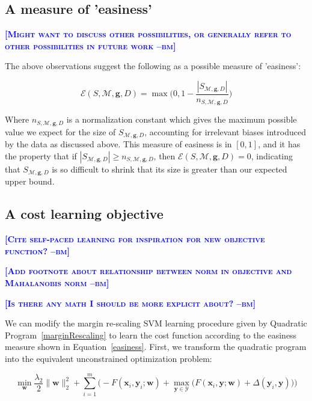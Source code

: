 \documentclass{article} %
\newcommand{\bmcomment}[1]{\textcolor{blue}{\textsc{\textbf{[#1 --bm]}}}}
\begin{document}
\subsection{A measure of 'easiness'}

\bmcomment{Might want to discuss other possibilities, or generally
refer to other possibilities in future work}

The above observations suggest the following as a possible 
measure of 'easiness':

\begin{equation}
\label{easiness}
\mathcal{E}(S,\mathcal{M},\mathbf{g},D)=\max\bigg(0, 1-\frac{|S_{\mathcal{M},\mathbf{g},D}|}{n_{S,\mathcal{M},\mathbf{g},D}}\bigg)
\end{equation}

Where $n_{S,\mathcal{M},\mathbf{g},D}$ is a normalization constant which
gives the maximum possible value we expect for the size of 
$S_{\mathcal{M},\mathbf{g},D}$, accounting for irrelevant biases
introduced by the data as discussed above.  This measure of easiness 
is in $[0,1]$, and it has the property that if 
$|S_{\mathcal{M},\mathbf{g},D}|\geq n_{S,\mathcal{M},\mathbf{g},D}$,
then $\mathcal{E}(S,\mathcal{M},\mathbf{g},D)=0$, indicating that
$S_{\mathcal{M},\mathbf{g},D}$ is so difficult to shrink that its
size is greater than our expected upper bound.

\subsection{A cost learning objective}

\bmcomment{Cite self-paced learning for inspiration for new objective function?}

\bmcomment{Add footnote about relationship between norm in objective and
Mahalanobis norm}

\bmcomment{Is there any math I should be more explicit about?}

We can modify the margin re-scaling SVM learning procedure given by 
Quadratic Program~\ref{marginRescaling} to learn the cost function 
according to the easiness measure shown in Equation~\ref{easiness}.
First, we transform the quadratic program
into the equivalent unconstrained optimization problem:

\begin{equation}
\label{svmObjective}
\min_{\mathbf{w}} \frac{\lambda_2}{2}\|\mathbf{w}\|_2^2 + \sum_{i=1}^m\bigg(-F(\mathbf{x}_i,\mathbf{y}_i;\mathbf{w})+\max_{\mathbf{y}\in \mathcal{Y}}\Big(F(\mathbf{x}_i,\mathbf{y};\mathbf{w})+\Delta(\mathbf{y}_i,\mathbf{y})\Big)\bigg)
\end{equation}
\end{document}
